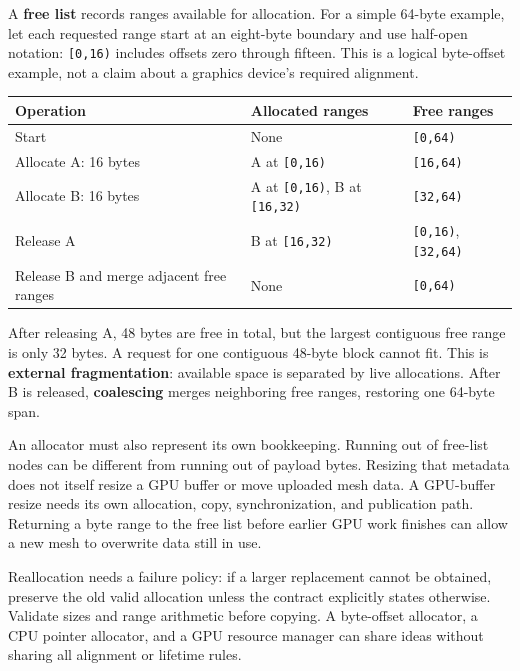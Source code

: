 \hypertarget{05-engine-i-ch014-total-free-space-is-not-necessarily-one-usable-range}{}

A \textbf{free list} records ranges available for allocation. For a simple 64-byte example, let each requested range start at an eight-byte boundary and use half-open notation: \texttt{{[}0,16)} includes offsets zero through fifteen. This is a logical byte-offset example, not a claim about a graphics device's required alignment.

{\def\LTcaptype{none} %
\begin{longtable}[]{@{}lll@{}}
\toprule\noalign{}
Operation & Allocated ranges & Free ranges \\
\midrule\noalign{}
\endhead
\bottomrule\noalign{}
\endlastfoot
Start & None & \texttt{{[}0,64)} \\
Allocate A: 16 bytes & A at \texttt{{[}0,16)} & \texttt{{[}16,64)} \\
Allocate B: 16 bytes & A at \texttt{{[}0,16)}, B at \texttt{{[}16,32)} & \texttt{{[}32,64)} \\
Release A & B at \texttt{{[}16,32)} & \texttt{{[}0,16)}, \texttt{{[}32,64)} \\
Release B and merge adjacent free ranges & None & \texttt{{[}0,64)} \\
\end{longtable}
}

After releasing A, 48 bytes are free in total, but the largest contiguous free range is only 32 bytes. A request for one contiguous 48-byte block cannot fit. This is \textbf{external fragmentation}: available space is separated by live allocations. After B is released, \textbf{coalescing} merges neighboring free ranges, restoring one 64-byte span.

An allocator must also represent its own bookkeeping. Running out of free-list nodes can be different from running out of payload bytes. Resizing that metadata does not itself resize a GPU buffer or move uploaded mesh data. A GPU-buffer resize needs its own allocation, copy, synchronization, and publication path. Returning a byte range to the free list before earlier GPU work finishes can allow a new mesh to overwrite data still in use.

Reallocation needs a failure policy: if a larger replacement cannot be obtained, preserve the old valid allocation unless the contract explicitly states otherwise. Validate sizes and range arithmetic before copying. A byte-offset allocator, a CPU pointer allocator, and a GPU resource manager can share ideas without sharing all alignment or lifetime rules.

